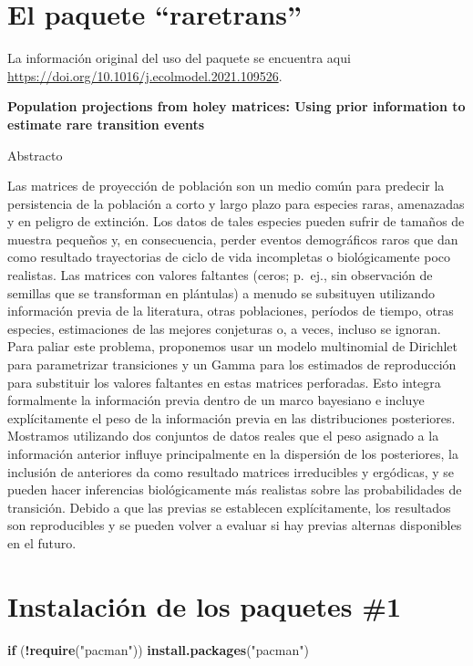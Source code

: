 \documentclass[
]{book}
\newenvironment{Shaded}{\begin{snugshade}}{\end{snugshade}}
\newcommand{\ControlFlowTok}[1]{\textcolor[rgb]{0.13,0.29,0.53}{\textbf{#1}}}
\newcommand{\FunctionTok}[1]{\textcolor[rgb]{0.13,0.29,0.53}{\textbf{#1}}}
\newcommand{\NormalTok}[1]{#1}
\newcommand{\SpecialCharTok}[1]{\textcolor[rgb]{0.81,0.36,0.00}{\textbf{#1}}}
\newcommand{\StringTok}[1]{\textcolor[rgb]{0.31,0.60,0.02}{#1}}
\theoremstyle{definition}
\theoremstyle{definition}
\theoremstyle{definition}
\theoremstyle{definition}
\theoremstyle{remark}
\begin{document}
\section{El paquete ``raretrans''}\label{el-paquete-raretrans}

La información original del uso del paquete se encuentra aqui \url{https://doi.org/10.1016/j.ecolmodel.2021.109526}.

\textbf{Population projections from holey matrices: Using prior information to estimate rare transition events}

Abstracto

Las matrices de proyección de población son un medio común para predecir la persistencia de la población a corto y largo plazo para especies raras, amenazadas y en peligro de extinción. Los datos de tales especies pueden sufrir de tamaños de muestra pequeños y, en consecuencia, perder eventos demográficos raros que dan como resultado trayectorias de ciclo de vida incompletas o biológicamente poco realistas. Las matrices con valores faltantes (ceros; p.~ej., sin observación de semillas que se transforman en plántulas) a menudo se subsituyen utilizando información previa de la literatura, otras poblaciones, períodos de tiempo, otras especies, estimaciones de las mejores conjeturas o, a veces, incluso se ignoran. Para paliar este problema, proponemos usar un modelo multinomial de Dirichlet para parametrizar transiciones y un Gamma para los estimados de reproducción para substituir los valores faltantes en estas matrices perforadas. Esto integra formalmente la información previa dentro de un marco bayesiano e incluye explícitamente el peso de la información previa en las distribuciones posteriores. Mostramos utilizando dos conjuntos de datos reales que el peso asignado a la información anterior influye principalmente en la dispersión de los posteriores, la inclusión de anteriores da como resultado matrices irreducibles y ergódicas, y se pueden hacer inferencias biológicamente más realistas sobre las probabilidades de transición. Debido a que las previas se establecen explícitamente, los resultados son reproducibles y se pueden volver a evaluar si hay previas alternas disponibles en el futuro.

\section{Instalación de los paquetes \#1}\label{instalaciuxf3n-de-los-paquetes-1}

\begin{Shaded}
\begin{Highlighting}[]
\ControlFlowTok{if}\NormalTok{ (}\SpecialCharTok{!}\FunctionTok{require}\NormalTok{(}\StringTok{"pacman"}\NormalTok{)) }\FunctionTok{install.packages}\NormalTok{(}\StringTok{"pacman"}\NormalTok{)}
\end{Highlighting}
\end{Shaded}
\end{document}
